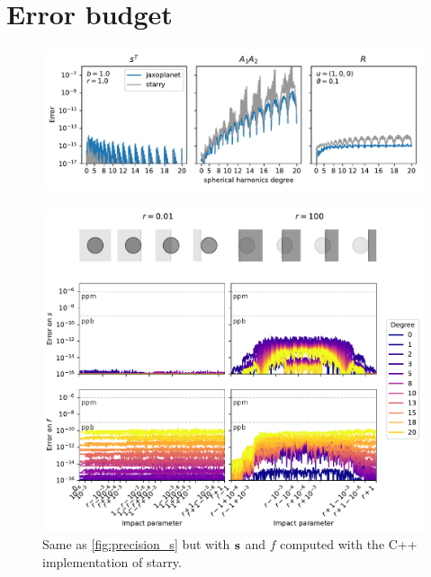 \documentclass[modern]{aastex631}
\begin{document}
\section{Error budget}
\begin{figure}[H]
    \begin{center}
        \includegraphics[width=\textwidth]{../workflows/precision/figures/error_SAR.pdf}
        \caption{}
        \label{fig:precision_SAR}
    \end{center}
\end{figure}

\begin{figure}[H]
    \begin{center}
        \includegraphics[width=\textwidth]{../workflows/precision/figures/error_starry.pdf}
        \caption{Same as \autoref{fig:precision_s} but with ${\mathbf{s}}$ and $f$ computed with the C++ implementation of \textsf{starry}. }
        \label{fig:precision_s_starry}
    \end{center}
\end{figure}
\end{document}
